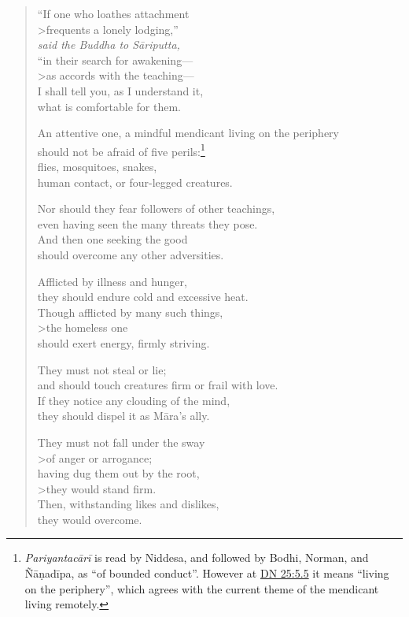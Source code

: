 \documentclass[12pt,openany]{book}%
\newcommand*{\scspeaker}[1]{\hspace{2em}\textit{#1}}
\begin{document}
\begin{verse}
“If one who loathes attachment \\>frequents a lonely lodging,” \\
\scspeaker{said the Buddha to \textsanskrit{Sāriputta}, }\\
“in their search for awakening—\\>as accords with the teaching—\\
I shall tell you, as I understand it, \\
what is comfortable for them. 

An attentive one, a mindful mendicant living on the periphery \\
should not be afraid of five perils:\footnote{\textit{\textsanskrit{Pariyantacārī}} is read by Niddesa, and followed by Bodhi, Norman, and \textsanskrit{Ñāṇadīpa}, as “of bounded conduct”. However at \href{https://suttacentral.net/dn25/en/sujato\#5.5}{DN 25:5.5} it means “living on the periphery”, which agrees with the current theme of the mendicant living remotely. } \\
flies, mosquitoes, snakes, \\
human contact, or four-legged creatures. 

Nor should they fear followers of other teachings, \\
even having seen the many threats they pose. \\
And then one seeking the good \\
should overcome any other adversities. 

Afflicted by illness and hunger, \\
they should endure cold and excessive heat. \\
Though afflicted by many such things, \\>the homeless one \\
should exert energy, firmly striving. 

They must not steal or lie; \\
and should touch creatures firm or frail with love. \\
If they notice any clouding of the mind, \\
they should dispel it as \textsanskrit{Māra}’s ally. 

They must not fall under the sway \\>of anger or arrogance; \\
having dug them out by the root, \\>they would stand firm. \\
Then, withstanding likes and dislikes, \\
they would overcome. 


\end{verse}
\end{document}
